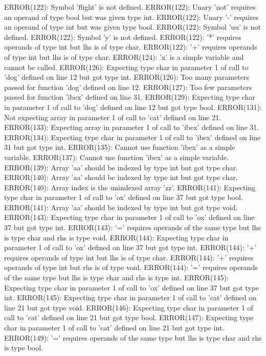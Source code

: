 \documentclass[12pt]{book}
\begin{document}
ERROR(122): Symbol 'flight' is not defined.
ERROR(122): Unary 'not' requires an operand of type bool but was given type int.
ERROR(122): Unary '-' requires an operand of type int but was given type bool.
ERROR(122): Symbol 'uu' is not defined.
ERROR(122): Symbol 'y' is not defined.
ERROR(122): '*' requires operands of type int but lhs is of type char.
ERROR(122): '+' requires operands of type int but lhs is of type char.
ERROR(124): 'x' is a simple variable and cannot be called.
ERROR(126): Expecting type char in parameter 1 of call to 'dog' defined on line 12 but got type int.
ERROR(126): Too many parameters passed for function 'dog' defined on line 12.
ERROR(127): Too few parameters passed for function 'ibex' defined on line 31.
ERROR(129): Expecting type char in parameter 1 of call to 'dog' defined on line 12 but got type bool.
ERROR(131): Not expecting array in parameter 1 of call to 'cat' defined on line 21.
ERROR(133): Expecting array in parameter 1 of call to 'ibex' defined on line 31.
ERROR(134): Expecting type char in parameter 1 of call to 'ibex' defined on line 31 but got type int.
ERROR(135): Cannot use function 'ibex' as a simple variable.
ERROR(137): Cannot use function 'ibex' as a simple variable.
ERROR(139): Array 'aa' should be indexed by type int but got type char.
ERROR(140): Array 'aa' should be indexed by type int but got type char.
ERROR(140): Array index is the unindexed array 'zz'.
ERROR(141): Expecting type char in parameter 1 of call to 'ox' defined on line 37 but got type bool.
ERROR(141): Array 'aa' should be indexed by type int but got type void.
ERROR(143): Expecting type char in parameter 1 of call to 'ox' defined on line 37 but got type int.
ERROR(143): '=' requires operands of the same type but lhs is type char and rhs is type void.
ERROR(144): Expecting type char in parameter 1 of call to 'ox' defined on line 37 but got type int.
ERROR(144): '+' requires operands of type int but lhs is of type char.
ERROR(144): '+' requires operands of type int but rhs is of type void.
ERROR(144): '=' requires operands of the same type but lhs is type char and rhs is type int.
ERROR(145): Expecting type char in parameter 1 of call to 'ox' defined on line 37 but got type int.
ERROR(145): Expecting type char in parameter 1 of call to 'cat' defined on line 21 but got type void.
ERROR(146): Expecting type char in parameter 1 of call to 'cat' defined on line 21 but got type bool.
ERROR(147): Expecting type char in parameter 1 of call to 'cat' defined on line 21 but got type int.
ERROR(149): '=' requires operands of the same type but lhs is type char and rhs is type bool.
\end{document}
